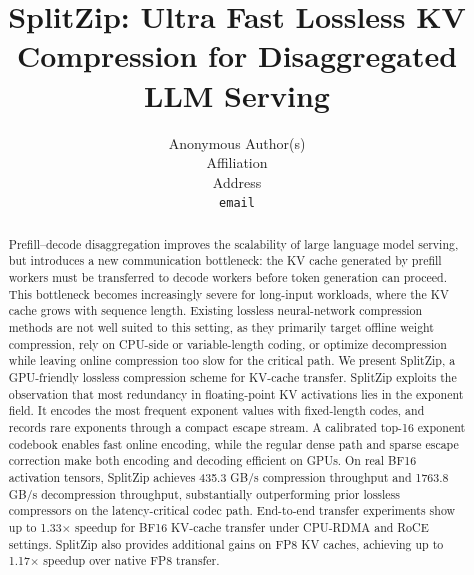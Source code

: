 \documentclass{article}
\title{SplitZip: Ultra Fast Lossless KV Compression for Disaggregated LLM Serving}
\author{%
  Anonymous Author(s) \\
  Affiliation \\
  Address \\
  \texttt{email} \\
}
\begin{document}
\maketitle

\begin{abstract}
Prefill--decode disaggregation improves the scalability of large language model serving, but introduces a new communication bottleneck: the KV cache generated by prefill workers must be transferred to decode workers before token generation can proceed. 
This bottleneck becomes increasingly severe for long-input workloads, where the KV cache grows with sequence length. 
Existing lossless neural-network compression methods are not well suited to this setting, as they primarily target offline weight compression, rely on CPU-side or variable-length coding, or optimize decompression while leaving online compression too slow for the critical path.
We present SplitZip, a GPU-friendly lossless compression scheme for KV-cache transfer. 
SplitZip exploits the observation that most redundancy in floating-point KV activations lies in the exponent field. 
It encodes the most frequent exponent values with fixed-length codes, and records rare exponents through a compact escape stream. 
A calibrated top-16 exponent codebook enables fast online encoding, while the regular dense path and sparse escape correction make both encoding and decoding efficient on GPUs.
On real BF16 activation tensors, SplitZip achieves 435.3 GB/s compression throughput and 1763.8 GB/s decompression throughput, substantially outperforming prior lossless compressors on the latency-critical codec path. 
End-to-end transfer experiments show up to 1.33$\times$ speedup for BF16 KV-cache transfer under CPU-RDMA and RoCE settings. 
SplitZip also provides additional gains on FP8 KV caches, achieving up to 1.17$\times$ speedup over native FP8 transfer.
\end{abstract}







{\small


}

\newpage


\end{document}

